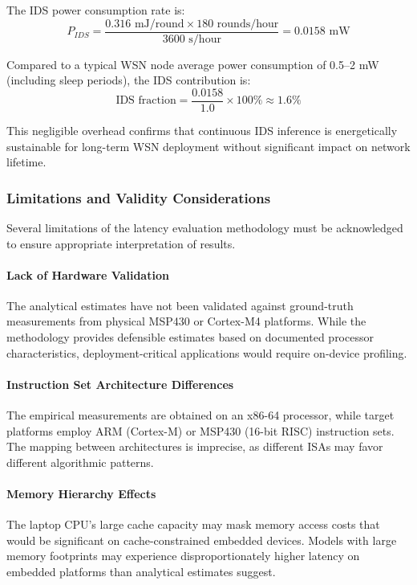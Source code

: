 The IDS power consumption rate is:
\begin{equation}
    P_{IDS} = \frac{0.316 \text{ mJ/round} \times 180 \text{ rounds/hour}}{3600 \text{ s/hour}} = 0.0158 \text{ mW}
\end{equation}

Compared to a typical WSN node average power consumption of 0.5--2 mW (including sleep periods), the IDS contribution is:
\begin{equation}
    \text{IDS fraction} = \frac{0.0158}{1.0} \times 100\% \approx 1.6\%
\end{equation}

This negligible overhead confirms that continuous IDS inference is energetically sustainable for long-term WSN deployment without significant impact on network lifetime.

\subsubsection{Limitations and Validity Considerations}

Several limitations of the latency evaluation methodology must be acknowledged to ensure appropriate interpretation of results.

\paragraph{Lack of Hardware Validation}
The analytical estimates have not been validated against ground-truth measurements from physical MSP430 or Cortex-M4 platforms. While the methodology provides defensible estimates based on documented processor characteristics, deployment-critical applications would require on-device profiling.

\paragraph{Instruction Set Architecture Differences}
The empirical measurements are obtained on an x86-64 processor, while target platforms employ ARM (Cortex-M) or MSP430 (16-bit RISC) instruction sets. The mapping between architectures is imprecise, as different ISAs may favor different algorithmic patterns.

\paragraph{Memory Hierarchy Effects}
The laptop CPU's large cache capacity may mask memory access costs that would be significant on cache-constrained embedded devices. Models with large memory footprints may experience disproportionately higher latency on embedded platforms than analytical estimates suggest.

